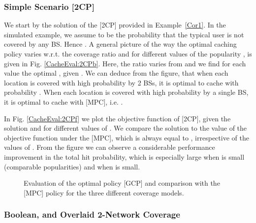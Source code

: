 \documentclass[conference,twocolum,final]{IEEEtran}
\begin{document}
{\subsubsection{Simple Scenario [2CP]}
We start by the solution of the [2CP] provided in Example~\ref{Cor1}.  In the simulated example, we assume  to be the probability that the typical user is not covered by any BS. Hence . A general picture of the way the optimal caching policy  varies w.r.t. the coverage ratio  and for different values of the popularity , is given in Fig. \ref{CacheEval:2CPb}. Here, the ratio  varies from  and we find for each value the optimal , given . We can deduce from the figure, that when each location is covered with high probability by 2 BSs, it is optimal to cache with probability . When each location is covered with high probability by a single BS, it is optimal to cache with [MPC], i.e. . 


In Fig. \ref{CacheEval:2CPf} we plot the objective function  of [2CP], given the solution  and for different values of . We compare the solution to the value of the objective function under the [MPC], which is always equal to , irrespective of the values of . From the figure we can observe a considerable performance improvement in the total hit probability, which is especially large when  is small (comparable popularities) and when  is small. 



\begin{figure*}[th!]    
\centering  
\label{CacheEval2}        
\caption{Evaluation of the optimal policy [GCP] and comparison with the [MPC] policy for the three different coverage models.}
\end{figure*}


\subsubsection{Boolean,  and Overlaid 2-Network Coverage}

}
\end{document}
